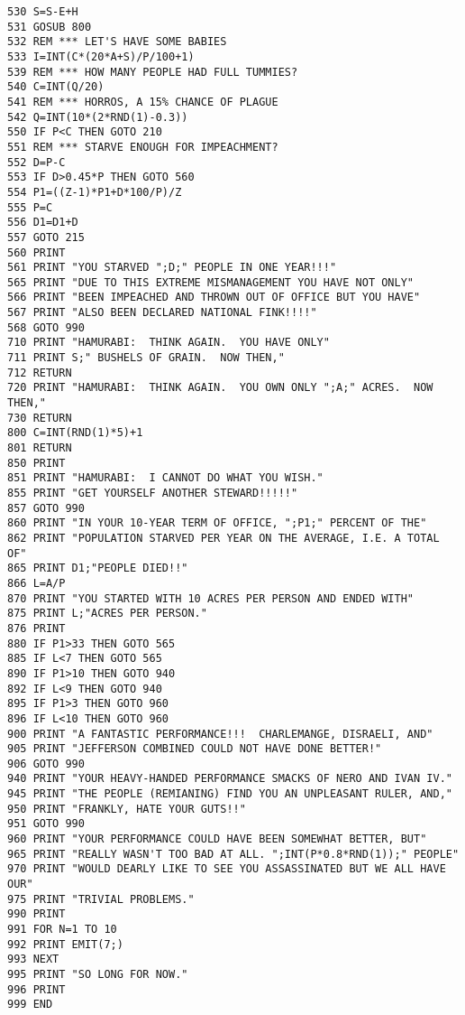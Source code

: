 \begin{lstlisting}
530 S=S-E+H
531 GOSUB 800
532 REM *** LET'S HAVE SOME BABIES
533 I=INT(C*(20*A+S)/P/100+1)
539 REM *** HOW MANY PEOPLE HAD FULL TUMMIES?
540 C=INT(Q/20)
541 REM *** HORROS, A 15% CHANCE OF PLAGUE
542 Q=INT(10*(2*RND(1)-0.3))
550 IF P<C THEN GOTO 210
551 REM *** STARVE ENOUGH FOR IMPEACHMENT?
552 D=P-C
553 IF D>0.45*P THEN GOTO 560
554 P1=((Z-1)*P1+D*100/P)/Z
555 P=C
556 D1=D1+D
557 GOTO 215
560 PRINT
561 PRINT "YOU STARVED ";D;" PEOPLE IN ONE YEAR!!!"
565 PRINT "DUE TO THIS EXTREME MISMANAGEMENT YOU HAVE NOT ONLY"
566 PRINT "BEEN IMPEACHED AND THROWN OUT OF OFFICE BUT YOU HAVE"
567 PRINT "ALSO BEEN DECLARED NATIONAL FINK!!!!"
568 GOTO 990
710 PRINT "HAMURABI:  THINK AGAIN.  YOU HAVE ONLY"
711 PRINT S;" BUSHELS OF GRAIN.  NOW THEN,"
712 RETURN
720 PRINT "HAMURABI:  THINK AGAIN.  YOU OWN ONLY ";A;" ACRES.  NOW THEN,"
730 RETURN
800 C=INT(RND(1)*5)+1
801 RETURN
850 PRINT
851 PRINT "HAMURABI:  I CANNOT DO WHAT YOU WISH."
855 PRINT "GET YOURSELF ANOTHER STEWARD!!!!!"
857 GOTO 990
860 PRINT "IN YOUR 10-YEAR TERM OF OFFICE, ";P1;" PERCENT OF THE"
862 PRINT "POPULATION STARVED PER YEAR ON THE AVERAGE, I.E. A TOTAL OF"
865 PRINT D1;"PEOPLE DIED!!"
866 L=A/P
870 PRINT "YOU STARTED WITH 10 ACRES PER PERSON AND ENDED WITH"
875 PRINT L;"ACRES PER PERSON."
876 PRINT
880 IF P1>33 THEN GOTO 565
885 IF L<7 THEN GOTO 565
890 IF P1>10 THEN GOTO 940
892 IF L<9 THEN GOTO 940
895 IF P1>3 THEN GOTO 960
896 IF L<10 THEN GOTO 960
900 PRINT "A FANTASTIC PERFORMANCE!!!  CHARLEMANGE, DISRAELI, AND"
905 PRINT "JEFFERSON COMBINED COULD NOT HAVE DONE BETTER!"
906 GOTO 990
940 PRINT "YOUR HEAVY-HANDED PERFORMANCE SMACKS OF NERO AND IVAN IV."
945 PRINT "THE PEOPLE (REMIANING) FIND YOU AN UNPLEASANT RULER, AND,"
950 PRINT "FRANKLY, HATE YOUR GUTS!!"
951 GOTO 990
960 PRINT "YOUR PERFORMANCE COULD HAVE BEEN SOMEWHAT BETTER, BUT"
965 PRINT "REALLY WASN'T TOO BAD AT ALL. ";INT(P*0.8*RND(1));" PEOPLE"
970 PRINT "WOULD DEARLY LIKE TO SEE YOU ASSASSINATED BUT WE ALL HAVE OUR"
975 PRINT "TRIVIAL PROBLEMS."
990 PRINT
991 FOR N=1 TO 10
992 PRINT EMIT(7;)
993 NEXT
995 PRINT "SO LONG FOR NOW."
996 PRINT
999 END
\end{lstlisting}
